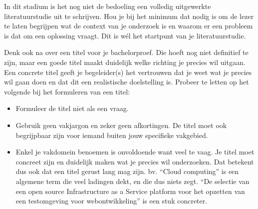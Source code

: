 In dit stadium is het nog niet de bedoeling een volledig uitgewerkte literatuurstudie uit te schrijven. Hou je bij het minimum dat nodig is om de lezer te laten begrijpen wat de context van je onderzoek is en waarom er een probleem is dat om een oplossing vraagt. Dit is wél het startpunt van je literatuurstudie.

Denk ook na over een titel voor je bachelorproef. Die hoeft nog niet definitief te zijn, maar een goede titel maakt duidelijk welke richting je precies wil uitgaan. Een concrete titel geeft je begeleider(s) het vertrouwen dat je weet wat je precies wil gaan doen en dat dit een realistische doelstelling is. Probeer te letten op het volgende bij het formuleren van een titel:

\begin{itemize}
  \item Formuleer de titel niet als een vraag.
  \item Gebruik geen vakjargon en zeker geen afkortingen. De titel moet ook begrijpbaar zijn voor iemand buiten jouw specifieke vakgebied.
  \item Enkel je vakdomein benoemen is onvoldoende want veel te vaag. Je titel moet concreet zijn en duidelijk maken wat je precies wil onderzoeken. Dat betekent dus ook dat een titel gerust lang mag zijn. bv. ``Cloud computing'' is een algemene term die veel ladingen dekt, en die dus niets zegt. ``De selectie van een open source Infrastructure as a Service platform voor het opzetten van een testomgeving voor webontwikkeling'' is een stuk concreter.
\end{itemize}



